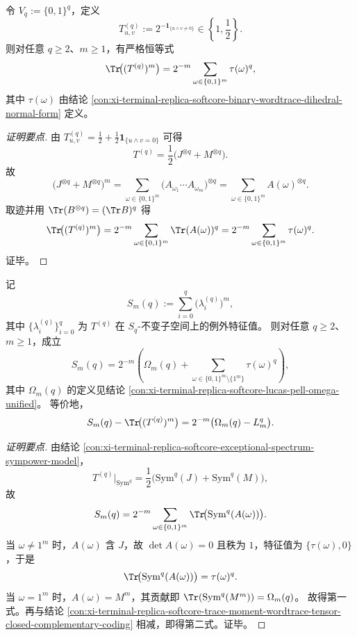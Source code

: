 \begin{conclusion}\label{con:xi-terminal-replica-softcore-trace-moment-wordtrace-tensor-closed-complementary-coding}
令 \(V_q:=\{0,1\}^q\)，定义
\[
T^{(q)}_{u,v}:=2^{-\mathbf 1_{\{u\wedge v\neq 0\}}}\in\left\{1,\frac12\right\}.
\]
则对任意 \(q\ge 2\)、\(m\ge 1\)，有严格恒等式
\[
\Tr\!\bigl((T^{(q)})^m\bigr)
=2^{-m}\sum_{\omega\in\{0,1\}^m}\tau(\omega)^q,
\]
其中 \(\tau(\omega)\) 由结论 \ref{con:xi-terminal-replica-softcore-binary-wordtrace-dihedral-normal-form} 定义。
\end{conclusion}
\begin{proof}[证明要点]
由
\(
T^{(q)}_{u,v}=\frac12+\frac12\mathbf 1_{\{u\wedge v=0\}}
\)
可得
\[
T^{(q)}=\frac12\bigl(J^{\otimes q}+M^{\otimes q}\bigr).
\]
故
\[
\bigl(J^{\otimes q}+M^{\otimes q}\bigr)^m
=\sum_{\omega\in\{0,1\}^m}\bigl(A_{\omega_1}\cdots A_{\omega_m}\bigr)^{\otimes q}
=\sum_{\omega\in\{0,1\}^m}A(\omega)^{\otimes q}.
\]
取迹并用 \(\Tr(B^{\otimes q})=(\Tr B)^q\) 得
\[
\Tr\!\bigl((T^{(q)})^m\bigr)
=2^{-m}\sum_{\omega\in\{0,1\}^m}\Tr(A(\omega))^q
=2^{-m}\sum_{\omega\in\{0,1\}^m}\tau(\omega)^q.
\]
证毕。
\end{proof}

\begin{conclusion}[例外幂和的单词替换原理与对称幂角色分离]\label{con:xi-terminal-replica-softcore-exceptional-power-sum-word-substitution-principle}
记
\[
S_m(q):=\sum_{i=0}^{q}\bigl(\lambda_i^{(q)}\bigr)^m,
\]
其中 \(\{\lambda_i^{(q)}\}_{i=0}^{q}\) 为 \(T^{(q)}\) 在 \(S_q\)-不变子空间上的例外特征值。
则对任意 \(q\ge 2\)、\(m\ge 1\)，成立
\[
S_m(q)
=2^{-m}\!\left(
\Omega_m(q)+
\sum_{\omega\in\{0,1\}^m\setminus\{1^m\}}\tau(\omega)^q
\right),
\]
其中 \(\Omega_m(q)\) 的定义见结论
\ref{con:xi-terminal-replica-softcore-lucas-pell-omega-unified}。
等价地，
\[
S_m(q)-\Tr\!\bigl((T^{(q)})^m\bigr)
=2^{-m}\bigl(\Omega_m(q)-L_m^q\bigr).
\]
\end{conclusion}
\begin{proof}[证明要点]
由结论 \ref{con:xi-terminal-replica-softcore-exceptional-spectrum-sympower-model}，
\[
T^{(q)}\big|_{\mathrm{Sym}^q}
=\frac12\bigl(\mathrm{Sym}^q(J)+\mathrm{Sym}^q(M)\bigr),
\]
故
\[
S_m(q)=2^{-m}\sum_{\omega\in\{0,1\}^m}
\Tr\!\bigl(\mathrm{Sym}^q(A(\omega))\bigr).
\]
当 \(\omega\neq 1^m\) 时，\(A(\omega)\) 含 \(J\)，故 \(\det A(\omega)=0\) 且秩为 \(1\)，特征值为 \(\{\tau(\omega),0\}\)，于是
\[
\Tr\!\bigl(\mathrm{Sym}^q(A(\omega))\bigr)=\tau(\omega)^q.
\]
当 \(\omega=1^m\) 时，\(A(\omega)=M^m\)，其贡献即
\(
\Tr(\mathrm{Sym}^q(M^m))=\Omega_m(q)
\)。
故得第一式。再与结论
\ref{con:xi-terminal-replica-softcore-trace-moment-wordtrace-tensor-closed-complementary-coding}
相减，即得第二式。证毕。
\end{proof}

